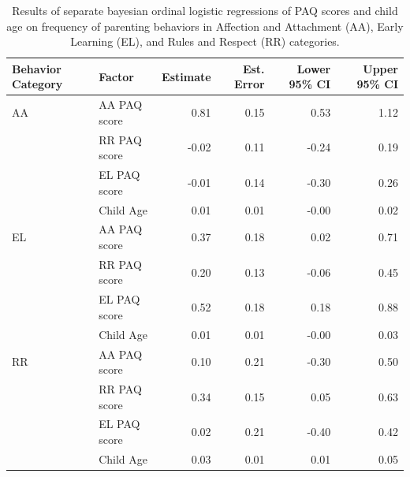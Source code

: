 \documentclass[floatsintext,man]{apa6}
\theoremstyle{definition}
\theoremstyle{definition}
\theoremstyle{definition}
\theoremstyle{remark}
\begin{document}
\begin{table}[h]
\centering
\caption{Results of separate bayesian ordinal logistic regressions of PAQ scores and child age on frequency of parenting behaviors in Affection and Attachment (AA), Early Learning (EL), and Rules and Respect (RR) categories.} 
\label{tab:behavetab}
\begin{tabular}{llrrrr}
  \hline
Behavior Category & Factor & Estimate & Est. Error & Lower 95\% CI & Upper 95\% CI \\ 
  \hline
AA & AA PAQ score & 0.81 & 0.15 & 0.53 & 1.12 \\ 
   & RR PAQ score & -0.02 & 0.11 & -0.24 & 0.19 \\ 
   & EL PAQ score & -0.01 & 0.14 & -0.30 & 0.26 \\ 
   & Child Age & 0.01 & 0.01 & -0.00 & 0.02 \\ 
   \hline
EL & AA PAQ score & 0.37 & 0.18 & 0.02 & 0.71 \\ 
   & RR PAQ score & 0.20 & 0.13 & -0.06 & 0.45 \\ 
   & EL PAQ score & 0.52 & 0.18 & 0.18 & 0.88 \\ 
   & Child Age & 0.01 & 0.01 & -0.00 & 0.03 \\ 
   \hline
RR & AA PAQ score & 0.10 & 0.21 & -0.30 & 0.50 \\ 
   & RR PAQ score & 0.34 & 0.15 & 0.05 & 0.63 \\ 
   & EL PAQ score & 0.02 & 0.21 & -0.40 & 0.42 \\ 
   & Child Age & 0.03 & 0.01 & 0.01 & 0.05 \\ 
   \hline
\end{tabular}
\end{table}
\end{document}

